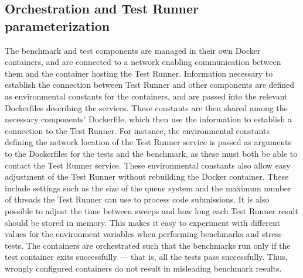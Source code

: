 \subsection{Orchestration and Test Runner parameterization}
The benchmark and test components are managed in their own Docker containers, and are connected to a network enabling communication between them and the container hosting the Test Runner. 
Information necessary to establish the connection between Test Runner and other components are defined as environmental constants for the containers, and are passed into the relevant Dockerfiles describing the services.
These constants are then shared among the necessary components' Dockerfile, which then use the information to establish a connection to the Test Runner.
For instance, the environmental constants defining the network location of the Test Runner service is passed as arguments to the Dockerfiles for the tests and the benchmark, as these must both be able to contact the Test Runner service.
These environmental constants also allow easy adjustment of the Test Runner without rebuilding the Docker container.
These include settings such as the size of the queue system and the maximum number of threads the Test Runner can use to process code submissions. 
It is also possible to adjust the time between sweeps and how long each Test Runner result should be stored in memory.
This makes it easy to experiment with different values for the environment variables when performing benchmarks and stress tests.  
The containers are orchestrated such that the benchmarks run only if the test container exits successfully --- that is, all the tests pass successfully. 
Thus, wrongly configured containers do not result in misleading benchmark results.

